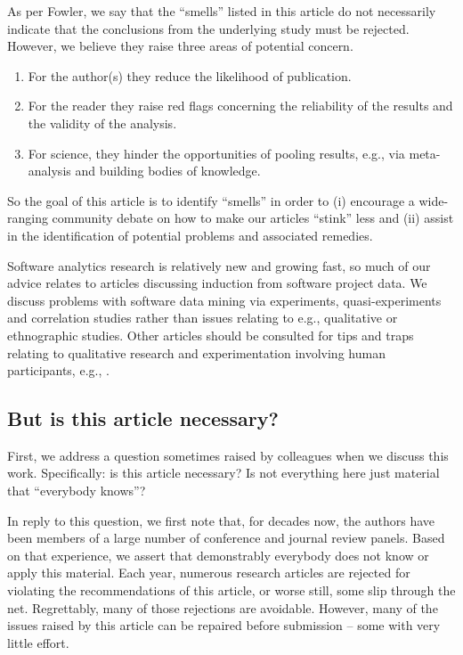 \documentclass[preprint,10pt]{elsarticle}
\begin{document}
As per Fowler, we say that the ``smells''  listed in this article do not necessarily indicate that the conclusions from the underlying study must be rejected.  However, we believe they raise three areas of potential concern.
\begin{enumerate}
    \item For the author(s) they reduce the likelihood of publication.
    \item For the reader they raise red flags concerning the reliability of the results and the validity of the analysis.
    \item For science, they hinder the opportunities of pooling results, e.g., via meta-analysis and building bodies of knowledge. 
\end{enumerate}
So the goal of this article is to identify ``smells'' in order to (i) encourage a wide-ranging community debate on how to make our articles ``stink'' less and (ii) assist in the identification of potential problems and associated remedies.  

Software analytics research is relatively new and growing fast, so much of our advice relates to articles discussing induction from software project data. We discuss problems with software data mining via experiments, quasi-experiments and correlation studies \cite{Shad02} rather than issues relating to e.g., qualitative or ethnographic studies.  Other articles should be consulted for tips and traps relating to qualitative research and experimentation involving human participants, e.g., \cite{stol2016grounded,cruzes2011research,ko2015practical,petersen2015guidelines}.


\subsection{But is this article necessary?}

First, we address a question sometimes raised by colleagues when we discuss this work. Specifically: is this article necessary? Is not everything here just material that ``everybody knows''?

In reply to this question, we first note that, for decades now, the authors have been members of a large number of conference and journal review panels. Based on that experience, we assert that demonstrably everybody does not know or apply this material. Each year, numerous research articles are rejected for violating the recommendations of this article, or worse still, some slip through the net.  Regrettably, many of those rejections are avoidable. However, many of the issues raised by this article can be repaired before submission -- some with very little effort.
\end{document}
